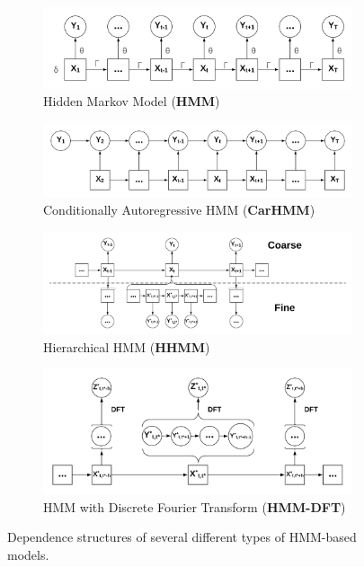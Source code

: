\begin{figure}[ht]
    \begin{subfigure}{\textwidth}
      \centering
      \includegraphics[width=4in]{../Plots/HMM.png}  
      \caption{Hidden Markov Model (\textbf{HMM})}
      \label{fig:HMM}
    \end{subfigure}
    \newline
    \begin{subfigure}{\textwidth}
      \centering
      \includegraphics[width=4in]{../Plots/CarHMM.png}  
      \caption{Conditionally Autoregressive HMM (\textbf{CarHMM})}
      \label{fig:CarHMM}
    \end{subfigure}
    \newline
    \begin{subfigure}{\textwidth}
      \centering
      \includegraphics[width=4in]{../Plots/HHMM.png}  
      \caption{Hierarchical HMM (\textbf{HHMM})}
      \label{fig:HHMM}
    \end{subfigure}
    \newline
    \begin{subfigure}{\textwidth}
      \centering
      \includegraphics[width=4in]{../Plots/HMM-DFT.png}  
      \caption{HMM with Discrete Fourier Transform (\textbf{HMM-DFT})}
      \label{fig:HMM-DFT}
    \end{subfigure}
    \caption{Dependence structures of several different types of HMM-based models.}
    \label{fig:models}
\end{figure}


